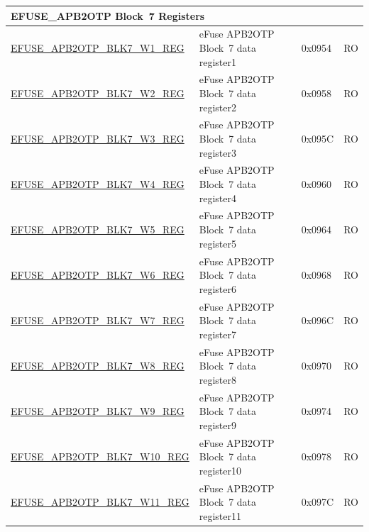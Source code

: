 \begin{longtable}{ | p{7cm} | p{6cm} | p{1.2cm} | p{1.5cm} | }
\multicolumn{4}{|l|}{\textbf{EFUSE\_APB2OTP Block~7 Registers}} \\ \hline
\hyperref[regdesc:EFUSEAPB2OTPBLK7WNREG]{EFUSE\_APB2OTP\_BLK7\_W1\_REG} & eFuse APB2OTP Block~7 data register1 & 0x0954 & RO \\\hline
\hyperref[regdesc:EFUSEAPB2OTPBLK7WNREG]{EFUSE\_APB2OTP\_BLK7\_W2\_REG} & eFuse APB2OTP Block~7 data register2 & 0x0958 & RO \\\hline
\hyperref[regdesc:EFUSEAPB2OTPBLK7WNREG]{EFUSE\_APB2OTP\_BLK7\_W3\_REG} & eFuse APB2OTP Block~7 data register3 & 0x095C & RO \\\hline
\hyperref[regdesc:EFUSEAPB2OTPBLK7WNREG]{EFUSE\_APB2OTP\_BLK7\_W4\_REG} & eFuse APB2OTP Block~7 data register4 & 0x0960 & RO \\\hline
\hyperref[regdesc:EFUSEAPB2OTPBLK7WNREG]{EFUSE\_APB2OTP\_BLK7\_W5\_REG} & eFuse APB2OTP Block~7 data register5 & 0x0964 & RO \\\hline
\hyperref[regdesc:EFUSEAPB2OTPBLK7WNREG]{EFUSE\_APB2OTP\_BLK7\_W6\_REG} & eFuse APB2OTP Block~7 data register6 & 0x0968 & RO \\\hline
\hyperref[regdesc:EFUSEAPB2OTPBLK7WNREG]{EFUSE\_APB2OTP\_BLK7\_W7\_REG} & eFuse APB2OTP Block~7 data register7 & 0x096C & RO \\\hline
\hyperref[regdesc:EFUSEAPB2OTPBLK7WNREG]{EFUSE\_APB2OTP\_BLK7\_W8\_REG} & eFuse APB2OTP Block~7 data register8 & 0x0970 & RO \\\hline
\hyperref[regdesc:EFUSEAPB2OTPBLK7WNREG]{EFUSE\_APB2OTP\_BLK7\_W9\_REG} & eFuse APB2OTP Block~7 data register9 & 0x0974 & RO \\\hline
\hyperref[regdesc:EFUSEAPB2OTPBLK7WNREG]{EFUSE\_APB2OTP\_BLK7\_W10\_REG} & eFuse APB2OTP Block~7 data register10 & 0x0978 & RO \\\hline
\hyperref[regdesc:EFUSEAPB2OTPBLK7WNREG]{EFUSE\_APB2OTP\_BLK7\_W11\_REG} & eFuse APB2OTP Block~7 data register11 & 0x097C & RO \\\hline


\end{longtable}
